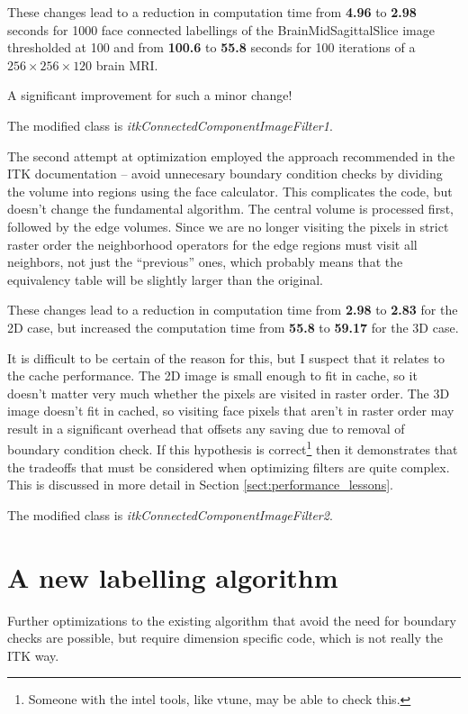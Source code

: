 \documentclass[IJ]{cesj}
\begin{document}
These changes lead to a reduction in computation time from {\bf 4.96}
to {\bf 2.98} seconds for 1000 face connected labellings of the
BrainMidSagittalSlice image thresholded at 100 and from {\bf 100.6} to
{\bf 55.8} seconds for 100 iterations of a $256 \times 256 \times 120$
brain MRI.

A significant improvement for such a minor change!

The modified class is {\em itkConnectedComponentImageFilter1}.

The second attempt at optimization employed the approach recommended
in the ITK documentation -- avoid unnecesary boundary condition checks
by dividing the volume into regions using the face calculator. This
complicates the code, but doesn't change the fundamental
algorithm. The central volume is processed first, followed by the edge
volumes. Since we are no longer visiting the pixels in strict raster
order the neighborhood operators for the edge regions must visit all
neighbors, not just the ``previous'' ones, which probably means that
the equivalency table will be slightly larger than the original.

These changes lead to a reduction in computation time from {\bf 2.98}
to {\bf 2.83} for the 2D case, but increased the computation time from
{\bf 55.8} to {\bf 59.17} for the 3D case.

It is difficult to be certain of the reason for this, but I suspect
that it relates to the cache performance. The 2D image is small enough
to fit in cache, so it doesn't matter very much whether the pixels are
visited in raster order. The 3D image doesn't fit in cached, so
visiting face pixels that aren't in raster order may result in a
significant overhead that offsets any saving due to removal of
boundary condition check. If this hypothesis is
correct\footnote{Someone with the intel tools, like vtune, may be able
to check this.} then it demonstrates that the tradeoffs that must be
considered when optimizing filters are quite complex. This is
discussed in more detail in Section \ref{sect:performance_lessons}.

The modified class is {\em itkConnectedComponentImageFilter2}.

\section{A new labelling algorithm}
Further optimizations to the existing algorithm that avoid the need
for boundary checks are possible, but require dimension specific code,
which is not really the ITK way.
\end{document}
